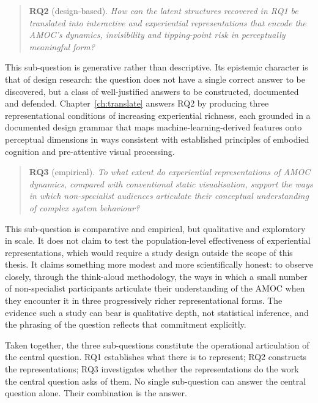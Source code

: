 \begin{quote}
\textbf{RQ2} (design-based). \emph{How can the latent structures recovered in \textup{RQ1} be translated into interactive and experiential representations that encode the AMOC's dynamics, invisibility and tipping-point risk in perceptually meaningful form?}
\end{quote}

This sub-question is generative rather than descriptive. Its epistemic character is that of design research: the question does not have a single correct answer to be discovered, but a class of well-justified answers to be constructed, documented and defended. Chapter~\ref{ch:translate} answers RQ2 by producing three representational conditions of increasing experiential richness, each grounded in a documented design grammar that maps machine-learning-derived features onto perceptual dimensions in ways consistent with established principles of embodied cognition and pre-attentive visual processing.

\begin{quote}
\textbf{RQ3} (empirical). \emph{To what extent do experiential representations of AMOC dynamics, compared with conventional static visualisation, support the ways in which non-specialist audiences articulate their conceptual understanding of complex system behaviour?}
\end{quote}

This sub-question is comparative and empirical, but qualitative and exploratory in scale. It does not claim to test the population-level effectiveness of experiential representations, which would require a study design outside the scope of this thesis. It claims something more modest and more scientifically honest: to observe closely, through the think-aloud methodology, the ways in which a small number of non-specialist participants articulate their understanding of the AMOC when they encounter it in three progressively richer representational forms. The evidence such a study can bear is qualitative depth, not statistical inference, and the phrasing of the question reflects that commitment explicitly.

Taken together, the three sub-questions constitute the operational articulation of the central question. RQ1 establishes what there is to represent; RQ2 constructs the representations; RQ3 investigates whether the representations do the work the central question asks of them. No single sub-question can answer the central question alone. Their combination is the answer.


